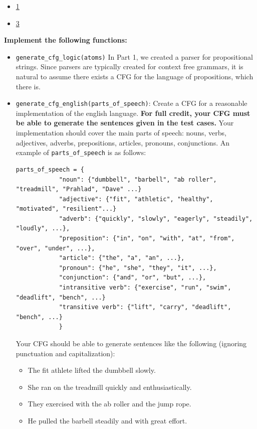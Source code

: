 \documentclass{article}
\begin{document}
    \begin{itemize}
        \item \href{http://faculty.washington.edu/cicero/370syntax.htm}{1}
        \item \href{http://aritter.github.io/courses/5525_slides/cfg.pdf}{3}
    \end{itemize}

    
\begin{tcolorbox}[enhanced,interior style={top color=Dandelion!20,bottom color=Dandelion!30}]
    \textbf{Implement the following functions:}

    \begin{itemize}
        \item \lstinline{generate_cfg_logic(atoms)} In Part 1, we created a parser for propositional strings. Since parsers are typically created for context free grammars, it is natural to assume there exists a CFG for the language of propositions, which there is.
        \item
        \lstinline{generate_cfg_english(parts_of_speech)}: Create a CFG for a reasonable implementation of the english language. \textbf{For full credit, your CFG must be able to generate the sentences given in the test cases.} 
            Your implementation should cover the main parts of speech: nouns, verbs, adjectives, adverbs, prepositions, articles, pronouns, conjunctions. An example of \lstinline{parts_of_speech} is as follows:
        \begin{lstlisting}[belowskip=-10pt]
        parts_of_speech = {
            "noun": {"dumbbell", "barbell", "ab roller", "treadmill", "Prahlad", "Dave" ...}
            "adjective": {"fit", "athletic", "healthy", "motivated", "resilient"...}
            "adverb": {"quickly", "slowly", "eagerly", "steadily", "loudly", ...},
            "preposition": {"in", "on", "with", "at", "from", "over", "under", ...},
            "article": {"the", "a", "an", ...},
            "pronoun": {"he", "she", "they", "it", ...},
            "conjunction": {"and", "or", "but", ...},
            "intransitive verb": {"exercise", "run", "swim", "deadlift", "bench", ...}
            "transitive verb": {"lift", "carry", "deadlift", "bench", ...}
            }
            \end{lstlisting}
            Your CFG should be able to generate sentences like the following (ignoring punctuation and capitalization):
            
            \begin{itemize}
                \item The fit athlete lifted the dumbbell slowly.
                \item She ran on the treadmill quickly and enthusiastically.
                \item They exercised with the ab roller and the jump rope.
                \item He pulled the barbell steadily and with great effort.
            \end{itemize}
            

\end{itemize}
\end{tcolorbox}
\end{document}
